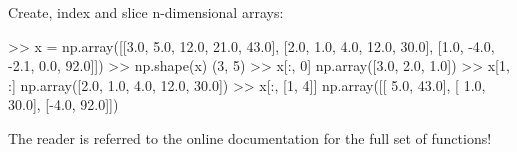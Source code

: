 Create, index and slice n-dimensional arrays:

\begin{python}[frame=single]
>> x = np.array([[3.0,  5.0, 12.0, 21.0, 43.0],
                 [2.0,  1.0,  4.0, 12.0, 30.0],
                 [1.0, -4.0, -2.1,  0.0, 92.0]])
>> np.shape(x)
(3, 5)
>> x[:, 0]
np.array([3.0, 2.0, 1.0])
>> x[1, :]
np.array([2.0, 1.0, 4.0, 12.0, 30.0])
>> x[:, [1, 4]]
np.array([[ 5.0, 43.0],
          [ 1.0, 30.0],
          [-4.0, 92.0]])
\end{python}

The reader is referred to the online documentation for the full set of functions!


